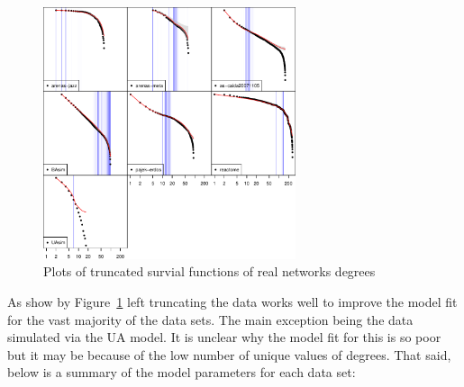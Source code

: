 \documentclass[
  10pt,
  a4paper,
]{scrreprt}
\theoremstyle{plain}
\theoremstyle{definition}
\theoremstyle{remark}
\begin{document}
{\begin{figure}[H]
{\centering \includegraphics[width=0.66\textwidth,height=\textheight]{doc_files/figure-pdf/fig-fits2-1.pdf}

}

\caption{\label{fig-fits2}Plots of truncated survial functions of real
networks degrees}

\end{figure}

As show by Figure~\ref{fig-fits2} left truncating the data works well to
improve the model fit for the vast majority of the data sets. The main
exception being the data simulated via the UA model. It is unclear why
the model fit for this is so poor but it may be because of the low
number of unique values of degrees. That said, below is a summary of the
model parameters for each data set:

}
\end{document}
